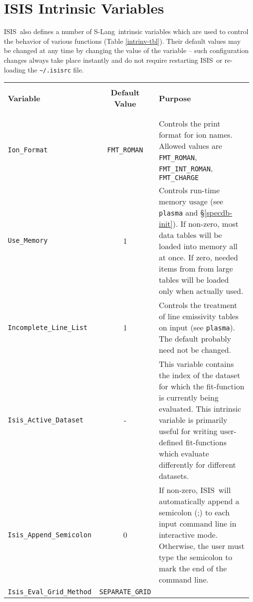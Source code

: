 \documentclass{book}
\newcommand{\isisx}{{\sc ISIS~}}
\newcommand{\isis}{{\sc ISIS}}
\newcommand{\slang}{{\sc S-Lang}}
\begin{document}
{\newpage
\section{ISIS Intrinsic Variables}
\label{sec:intrin-var}

\isisx also defines a number of \slang\ intrinsic variables which
are used to control the behavior of various functions (Table
\ref{intrinv-tbl}).  Their default values may be changed at any time by
changing the value of the variable -- such configuration changes always take
place instantly and do not require restarting \isisx or re-loading the
\verb|~/.isisrc| file.

\vspace*{-2cm}
\begin{center}
\label{intrinv-tbl} %
\begin{tabular}{|l|c|p{3.2in}|}
\hline
\rule[-1mm]{0mm}{1mm} & & \hfill \\
{\bf Variable} & {\bf Default Value} &  {\bf Purpose} \\
\rule[-1mm]{0mm}{1mm} & & \hfill \\
\hline
\rule[-1mm]{0mm}{1mm} & & \hfill \\
{\tt Ion\_Format}  & {\tt FMT\_ROMAN} & Controls the print format
for ion names. Allowed values are {\tt FMT\_ROMAN}, {\tt FMT\_INT\_ROMAN},
{\tt FMT\_CHARGE} \\
{\tt Use\_Memory} & 1 & Controls run-time memory usage (see {\tt plasma} and
\S\ref{specdb-init}). If non-zero, most data tables will be loaded into memory
all at once.  If zero, needed items from from large tables will be loaded
only when actually used.\\
{\tt Incomplete\_Line\_List} & 1 & Controls the treatment of line emissivity
tables on input (see {\tt plasma}). The default probably need not be changed.\\
{\tt Isis\_Active\_Dataset} & - & This variable contains the index of the
dataset for which the fit-function is currently being evaluated.  This
intrinsic variable is primarily useful for writing user-defined fit-functions
which evaluate differently for different datasets.\\
{\tt Isis\_Append\_Semicolon} & 0 & If non-zero, \isis\ will
automatically append a semicolon (;) to each input command line
in interactive mode.  Otherwise, the user must type the semicolon
to mark the end of the command line.\index{{\tt Isis\_Append\_Semicolon}}\\
{\tt Isis\_Eval\_Grid\_Method} & {\tt SEPARATE\_GRID} &

\end{tabular}
\end{center}}
\end{document}
